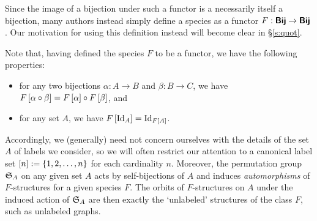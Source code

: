 \documentclass[distribution,draft]{brandiss} %
\numberwithin{section}{chapter}
\numberwithin{figure}{chapter}
\begin{document}
Since the image of a bijection under such a functor is a necessarily itself a bijection, many authors instead simply define a species as a functor $F: \boldsymbol{\mathsf{Bij}} \to \boldsymbol{\mathsf{Bij}}$.
Our motivation for using this definition instead will become clear in \S \ref{s:quot}.

Note that, having defined the species $F$ to be a functor, we have the following properties:
\begin{itemize}
\item for any two bijections $\alpha: A \to B$ and $\beta: B \to C$, we have $F \left[ {\alpha \circ \beta} \right] = F \left[ {\alpha} \right] \circ F \left[ {\beta} \right]$, and
\item for any set $A$, we have $F \left[ {\operatorname{Id}_{A}} \right] = \operatorname{Id}_{F \left[ {A} \right]}$.
\end{itemize}
Accordingly, we (generally) need not concern ourselves with the details of the set $A$ of labels we consider, so we will often restrict our attention to a canonical label set $\left[ {n} \right] := \left\{ {1, 2, \dots, n} \right\}$ for each cardinality $n$.
Moreover, the permutation group $ \mathfrak{S}_{A} $ on any given set $A$ acts by self-bijections of $A$ and induces \emph{automorphisms} of $F$-structures for a given species $F$.
The orbits of $F$-structures on $A$ under the induced action of $ \mathfrak{S}_{A} $ are then exactly the `unlabeled' structures of the class $F$, such as unlabeled graphs.
\end{document}
